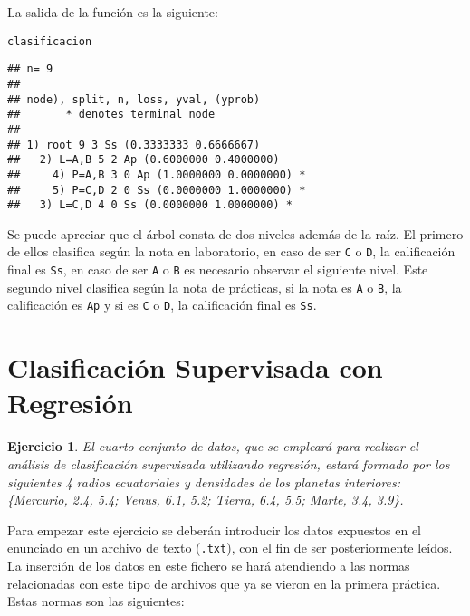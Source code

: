 \documentclass[12pt]{report}\usepackage[]{graphicx}\usepackage[dvipsnames]{xcolor}
\makeatletter
\newcommand{\hlstd}[1]{\textcolor[rgb]{0.345,0.345,0.345}{#1}}%
\newenvironment{kframe}{%
 \def\at@end@of@kframe{}%
 \ifinner\ifhmode%
  \def\at@end@of@kframe{\end{minipage}}%
  \begin{minipage}{\columnwidth}%
 \fi\fi%
 \def\FrameCommand##1{\hskip\@totalleftmargin \hskip-\fboxsep
 \colorbox{shadecolor}{##1}\hskip-\fboxsep
     \hskip-\linewidth \hskip-\@totalleftmargin \hskip\columnwidth}%
 \MakeFramed {\advance\hsize-\width
   \@totalleftmargin\z@ \linewidth\hsize
   \@setminipage}}%
 {\par\unskip\endMakeFramed%
 \at@end@of@kframe}
\newenvironment{knitrout}{}{} %
\newtheorem{exercise}{Ejercicio}[section]
\makeatother
\begin{document}
	La salida de la función es la siguiente:
	
\begin{knitrout}
\color{fgcolor}\begin{kframe}
\begin{alltt}
\hlstd{clasificacion}
\end{alltt}
\begin{verbatim}
## n= 9 
## 
## node), split, n, loss, yval, (yprob)
##       * denotes terminal node
## 
## 1) root 9 3 Ss (0.3333333 0.6666667)  
##   2) L=A,B 5 2 Ap (0.6000000 0.4000000)  
##     4) P=A,B 3 0 Ap (1.0000000 0.0000000) *
##     5) P=C,D 2 0 Ss (0.0000000 1.0000000) *
##   3) L=C,D 4 0 Ss (0.0000000 1.0000000) *
\end{verbatim}
\end{kframe}
\end{knitrout}
	
	Se puede apreciar que el árbol consta de dos niveles además de la raíz. El primero de ellos clasifica según la nota en laboratorio, en caso de ser \texttt{C} o \texttt{D}, la calificación final es \texttt{Ss}, en caso de ser \texttt{A} o \texttt{B} es necesario observar el siguiente nivel. Este segundo nivel clasifica según la nota de prácticas, si la nota es \texttt{A} o \texttt{B}, la calificación es \texttt{Ap} y si es \texttt{C} o \texttt{D}, la calificación final es \texttt{Ss}.
		
	\newpage
	
	\section{Clasificación Supervisada con Regresión}
	
	\begin{exercise}
		El cuarto conjunto de datos, que se empleará para realizar el análisis de clasificación supervisada utilizando regresión, estará formado por los siguientes 4 radios ecuatoriales y densidades de los planetas interiores:
		\{Mercurio, 2.4, 5.4; Venus, 6.1, 5.2; Tierra, 6.4, 5.5; Marte, 3.4, 3.9\}.
	\end{exercise}
	
	Para empezar este ejercicio se deberán introducir los datos expuestos en el enunciado en un archivo de texto (\texttt{.txt}), con el fin de ser posteriormente leídos. La inserción de los datos en este fichero se hará atendiendo a las normas relacionadas con este tipo de archivos que ya se vieron en la primera práctica. Estas normas son las siguientes:
	
\end{document}
